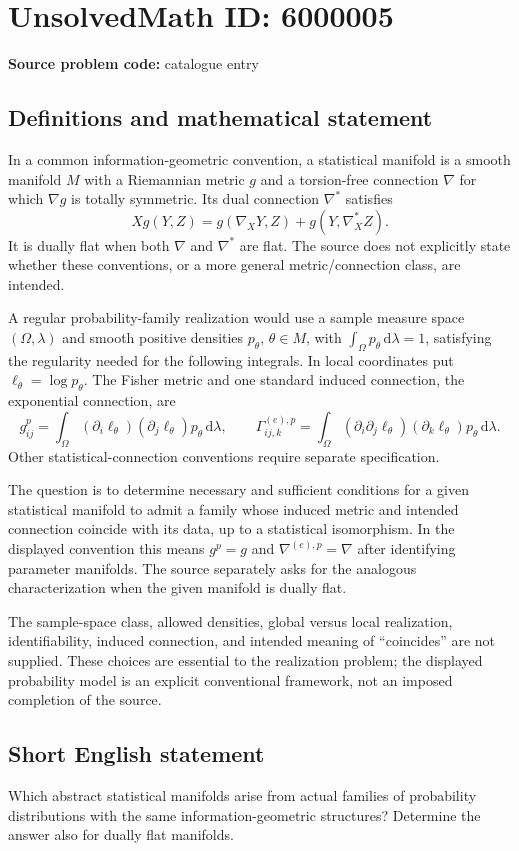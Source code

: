\documentclass[11pt]{article}
\begin{document}
\section*{UnsolvedMath ID: 6000005}
\textbf{Source problem code:} catalogue entry
\subsection{Definitions and mathematical statement}
In a common information-geometric convention, a statistical manifold is a smooth manifold $M$ with a Riemannian metric $g$ and a torsion-free connection $\nabla$ for which $\nabla g$ is totally symmetric. Its dual connection $\nabla^*$ satisfies
\[
 Xg(Y,Z)=g(\nabla_XY,Z)+g(Y,\nabla_X^*Z).
\]
It is dually flat when both $\nabla$ and $\nabla^*$ are flat. The source does not explicitly state whether these conventions, or a more general metric/connection class, are intended.

A regular probability-family realization would use a sample measure space $(\Omega,\lambda)$ and smooth positive densities $p_\theta$, $\theta\in M$, with $\int_\Omega p_\theta\,\mathrm d\lambda=1$, satisfying the regularity needed for the following integrals. In local coordinates put $\ell_\theta=\log p_\theta$. The Fisher metric and one standard induced connection, the exponential connection, are
\[
 g^{p}_{ij}=\int_\Omega
  (\partial_i\ell_\theta)(\partial_j\ell_\theta)p_\theta\,\mathrm d\lambda,
 \qquad
 \Gamma^{(e),p}_{ij,k}=\int_\Omega
  (\partial_i\partial_j\ell_\theta)(\partial_k\ell_\theta)
       p_\theta\,\mathrm d\lambda.
\]
Other statistical-connection conventions require separate specification.

The question is to determine necessary and sufficient conditions for a given statistical manifold to admit a family whose induced metric and intended connection coincide with its data, up to a statistical isomorphism. In the displayed convention this means $g^p=g$ and $\nabla^{(e),p}=\nabla$ after identifying parameter manifolds. The source separately asks for the analogous characterization when the given manifold is dually flat.

The sample-space class, allowed densities, global versus local realization, identifiability, induced connection, and intended meaning of ``coincides'' are not supplied. These choices are essential to the realization problem; the displayed probability model is an explicit conventional framework, not an imposed completion of the source.
\subsection{Short English statement}
Which abstract statistical manifolds arise from actual families of probability distributions with the same information-geometric structures? Determine the answer also for dually flat manifolds.
\end{document}
